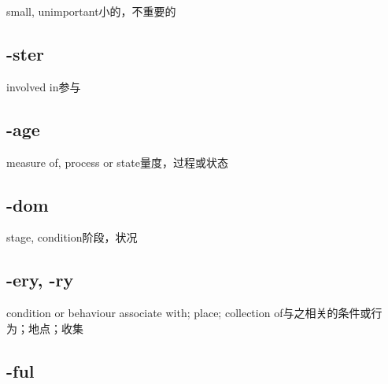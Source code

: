 \begin{nlist}{small, unimportant}{小的，不重要的}
\end{nlist}

\subsection{-ster}

\begin{nlist}{involved in}{参与}
\end{nlist}

\subsection{-age}

\begin{nlist}{measure of, process or state}{量度，过程或状态}
\end{nlist}

\subsection{-dom}

\begin{nlist}{stage, condition}{阶段，状况}
\end{nlist}

\subsection{-ery, -ry}

\begin{nlist}{condition or behaviour associate with; place; collection of}{与之相关的条件或行为；地点；收集}
\end{nlist}

\subsection{-ful}

